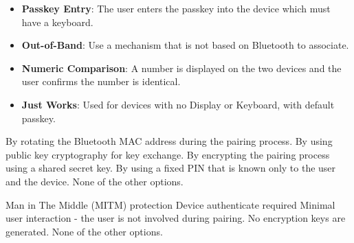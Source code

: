 \begin{solution}
    \begin{itemize}
        \item \textbf{Passkey Entry}: The user enters the passkey into the device which must have a keyboard.
        \item \textbf{Out-of-Band}: Use a mechanism that is not based on Bluetooth to associate.
        \item \textbf{Numeric Comparison}: A number is displayed on the two devices and the user confirms the number is identical.
        \item \textbf{Just Works}: Used for devices with no Display or Keyboard, with default passkey.
    \end{itemize}
\end{solution}

\begin{checkboxes}
    \choice By rotating the Bluetooth MAC address during the pairing process.
    \choice By using public key cryptography for key exchange.
    \CorrectChoice By encrypting the pairing process using a shared secret key.
    \choice By using a fixed PIN that is known only to the user and the device.
    \choice None of the other options.
\end{checkboxes}

\begin{checkboxes}
    \CorrectChoice Man in The Middle (MITM) protection
    \CorrectChoice Device authenticate required
    \choice Minimal user interaction - the user is not involved during pairing.
    \choice No encryption keys are generated.
    \choice None of the other options.
\end{checkboxes}